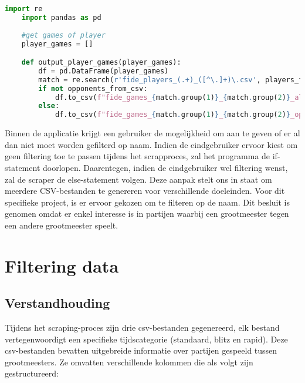 \begin{lstlisting}[language=Python]
    import re
    import pandas as pd
    
    #get games of player
    player_games = []

    def output_player_games(player_games):
        df = pd.DataFrame(player_games)
        match = re.search(r'fide_players_(.+)_([^\.]+)\.csv', players_file_name)
        if not opponents_from_csv:
            df.to_csv(f"fide_games_{match.group(1)}_{match.group(2)}_all.csv", index=False)
        else:
            df.to_csv(f"fide_games_{match.group(1)}_{match.group(2)}_oppfromcsv.csv", index=False)
\end{lstlisting}

Binnen de applicatie krijgt een gebruiker de mogelijkheid om aan te geven of er al dan niet moet worden gefilterd op naam. Indien de eindgebruiker ervoor kiest om geen filtering toe te passen tijdens het scrapproces, zal het programma de if-statement doorlopen. Daarentegen, indien de eindgebruiker wel filtering wenst, zal de scraper de else-statement volgen. Deze aanpak stelt ons in staat om meerdere CSV-bestanden te genereren voor verschillende doeleinden. Voor dit specifieke project, is er ervoor gekozen om te filteren op de naam. Dit besluit is genomen omdat er enkel interesse is in partijen waarbij een grootmeester tegen een andere grootmeester speelt.

\section{Filtering data}

\subsection{Verstandhouding}

Tijdens het scraping-proces zijn drie csv-bestanden gegenereerd, elk bestand vertegenwoordigt een specifieke tijdscategorie (standaard, blitz en rapid). Deze csv-bestanden bevatten uitgebreide informatie over partijen gespeeld tussen grootmeesters. Ze omvatten verschillende kolommen die als volgt zijn gestructureerd:

